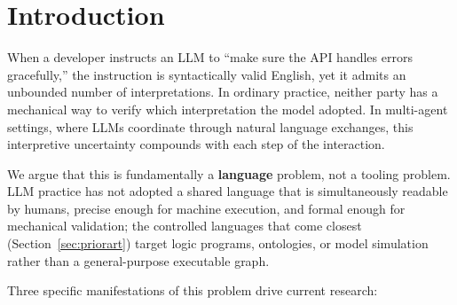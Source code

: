 \documentclass{article}
\begin{document}
\begin{abstract}
The system is language-agnostic by design: legal concepts such as obligation (\textit{shall}/\begin{CJK}{UTF8}{gbsn}应当\end{CJK}/\textit{deber\'a}) and computational operations such as \textit{filter} and \textit{validate} exist independently across major human languages. Loading a different vocabulary definition---itself a TRUG---switches the surface language while preserving the grammar and graph structure.

We release the complete specification, the language's self-describing definition (itself a TRUG), and worked examples under the Apache 2.0 license, together with a published reference toolchain, \texttt{trugs-tools} (the \texttt{trug} CLI---validation, TRL compilation, corpus audit).
\end{abstract}

\section{Introduction}

When a developer instructs an LLM to ``make sure the API handles errors gracefully,'' the instruction is syntactically valid English, yet it admits an unbounded number of interpretations. In ordinary practice, neither party has a mechanical way to verify which interpretation the model adopted. In multi-agent settings, where LLMs coordinate through natural language exchanges, this interpretive uncertainty compounds with each step of the interaction.

We argue that this is fundamentally a \textbf{language} problem, not a tooling problem. LLM practice has not adopted a shared language that is simultaneously readable by humans, precise enough for machine execution, and formal enough for mechanical validation; the controlled languages that come closest (Section~\ref{sec:priorart}) target logic programs, ontologies, or model simulation rather than a general-purpose executable graph.

Three specific manifestations of this problem drive current research:
\end{document}
